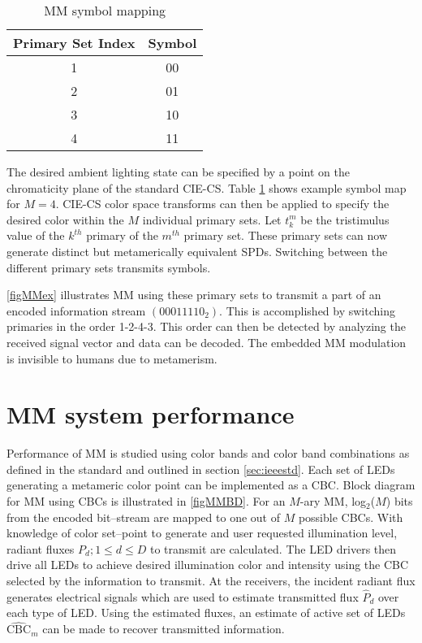 \begin{table}[!t]
	\centering
		\begin{tabular}{|c|c|}
		\hline
		{Primary Set Index} & {Symbol}\\
		\hline
		1 & 00\\
		2 & 01\\
		3 & 10\\
		4 & 11\\
		\hline
		\end{tabular}
	\caption{MM symbol mapping}
	\label{tblMMSymbol}
\end{table}

The desired ambient lighting state can be specified by a point on the chromaticity plane of the standard CIE-CS. Table \ref{tblMMSymbol} shows example symbol map for $M=4$. CIE-CS color space transforms can then be applied to specify the desired color within the $M$ individual primary sets. Let $t_{k}^{m}$ be the tristimulus value of the $k^{th}$ primary of the $m^{th}$ primary set. These primary sets can now generate distinct but metamerically equivalent SPDs. Switching between the different primary sets transmits symbols.

\figurename{ \ref{figMMex}} illustrates MM using these primary sets to transmit a part of an encoded information stream $(00011110_{2})$. This is accomplished by switching primaries in the order 1-2-4-3. This order can then be detected by analyzing the received signal vector and data can be decoded. The embedded MM modulation is invisible to humans due to metamerism.
\section{MM system performance}
\label{subsec:metamericPerformance}
Performance of MM is studied using color bands and color band combinations as defined in the standard and outlined in section \ref{sec:ieeestd}. Each set of LEDs generating a metameric color point can be implemented as a CBC. Block diagram for MM using CBCs is illustrated in \figurename{ \ref{figMMBD}}. For an $M$-ary MM, log$^{ }_{2}$($M$) bits from the encoded bit--stream are mapped to one out of $M$ possible CBCs. With knowledge of color set--point to generate and user requested illumination level, radiant fluxes $P_{d}; 1\leq d\leq D$ to transmit are calculated. The LED drivers then drive all LEDs to achieve desired illumination color and intensity using the CBC selected by the information to transmit. At the receivers, the incident radiant flux generates electrical signals which are used to estimate transmitted flux $\hat{P}_{d}$ over each type of LED. Using the estimated fluxes, an estimate of active set of LEDs $\hat{\text{CBC}}_{m}$ can be made to recover transmitted information.

